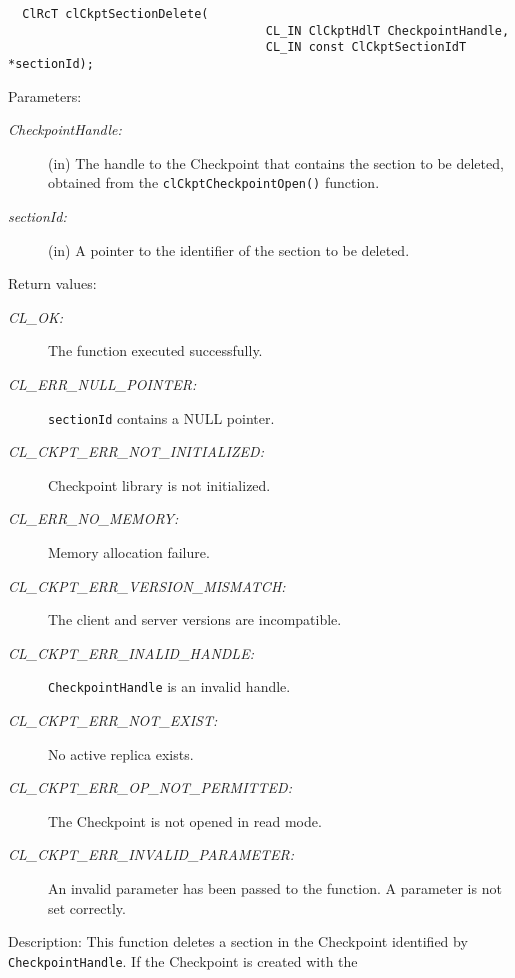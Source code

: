 \begin{flushleft}
\begin{Desc}
\footnotesize\begin{verbatim}  ClRcT clCkptSectionDelete(
                              		CL_IN ClCkptHdlT CheckpointHandle,
                              		CL_IN const ClCkptSectionIdT *sectionId);
\end{verbatim}
\normalsize
\end{Desc}
\begin{Desc}
\item[Parameters:]
\begin{description}
\item[{\em Checkpoint\-Handle:}](in) The handle to the Checkpoint that contains the section to be deleted, obtained from the {\tt{clCkptCheckpointOpen()}}
function. 
\item[{\em section\-Id:}](in) A pointer to the identifier of the section to be deleted.\end{description}
\end{Desc}
\begin{Desc}
\item[Return values:]
\begin{description}
\item[{\em CL\_\-OK:}]The function executed successfully. 
\item[{\em CL\_\-ERR\_\-NULL\_\-POINTER:}]{\tt{section\-Id}} contains a NULL pointer.
\item[{\em CL\_\-CKPT\_\-ERR\_\-NOT\_\-INITIALIZED:}]Checkpoint library is not initialized. 
\item[{\em CL\_\-ERR\_\-NO\_\-MEMORY:}]Memory allocation failure.
\item[{\em CL\_\-CKPT\_\-ERR\_\-VERSION\_\-MISMATCH:}]The client and server versions are incompatible.
\item[{\em CL\_\-CKPT\_\-ERR\_\-INALID\_\-HANDLE:}]{\tt{CheckpointHandle}} is an invalid handle.
\item[{\em CL\_\-CKPT\_\-ERR\_\-NOT\_\-EXIST:}] No active replica exists.
\item[{\em CL\_\-CKPT\_\-ERR\_\-OP\_\-NOT\_\-PERMITTED:}] The Checkpoint is not opened in read mode.
\item[{\em CL\_\-CKPT\_\-ERR\_\-INVALID\_\-PARAMETER:}]An invalid parameter has been passed to the function. A parameter is not set correctly.
\end{description}
\end{Desc}
\begin{Desc}
\item[Description:]This function deletes a section in the Checkpoint identified by {\tt{Checkpoint\-Handle}}. If the Checkpoint is created with the 

\end{Desc}
\end{flushleft}
